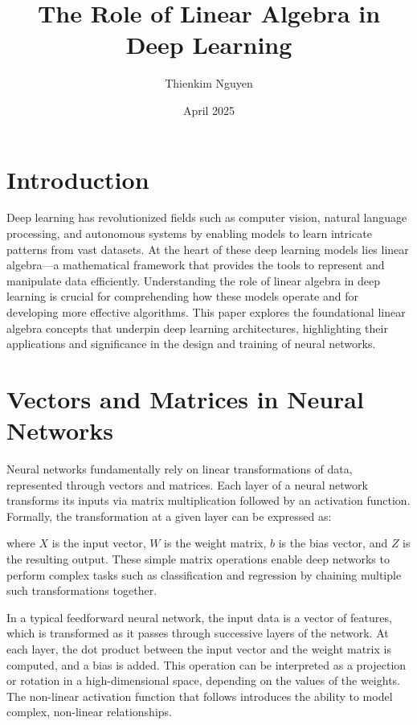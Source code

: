 \documentclass{article}
\title{The Role of Linear Algebra in Deep Learning}
\author{Thienkim Nguyen}
\date{April 2025}
\begin{document}
\maketitle


\section{Introduction}
Deep learning has revolutionized fields such as computer vision, natural language processing, and autonomous systems by enabling models to learn intricate patterns from vast datasets. At the heart of these deep learning models lies linear algebra—a mathematical framework that provides the tools to represent and manipulate data efficiently. Understanding the role of linear algebra in deep learning is crucial for comprehending how these models operate and for developing more effective algorithms. This paper explores the foundational linear algebra concepts that underpin deep learning architectures, highlighting their applications and significance in the design and training of neural networks.


\section{Vectors and Matrices in Neural Networks}
Neural networks fundamentally rely on linear transformations of data, represented through vectors and matrices. Each layer of a neural network transforms its inputs via matrix multiplication followed by an activation function. Formally, the transformation at a given layer can be expressed as:

where $X$ is the input vector, $W$ is the weight matrix, $b$ is the bias vector, and $Z$ is the resulting output. These simple matrix operations enable deep networks to perform complex tasks such as classification and regression by chaining multiple such transformations together.

In a typical feedforward neural network, the input data is a vector of features, which is transformed as it passes through successive layers of the network. At each layer, the dot product between the input vector and the weight matrix is computed, and a bias is added. This operation can be interpreted as a projection or rotation in a high-dimensional space, depending on the values of the weights. The non-linear activation function that follows introduces the ability to model complex, non-linear relationships.
\end{document}
